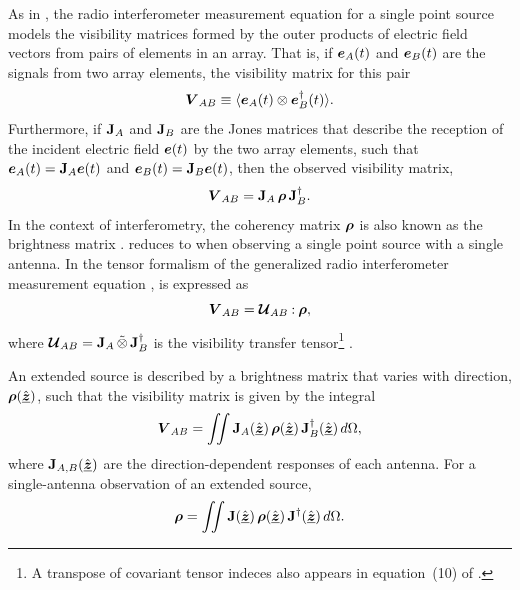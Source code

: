 As in \cite{smi11a}, the radio interferometer measurement equation for a single point source models the
visibility matrices formed by the outer products of electric field vectors from pairs of elements in an array.  That is, if $\mbox{\boldmath $e$}_A(t)$ and $\mbox{\boldmath $e$}_B(t)$ are the signals from two array elements, the visibility matrix for this pair
%
\begin{equation}
  \label{eqn:visibility}
  \mbox{\boldmath $V$}_{AB} \equiv\langle\mbox{\boldmath $e$}_A(t) \otimes \mbox{\boldmath $e$}_B^\dagger(t) \rangle.
\end{equation}
Furthermore, if ${\bf J}_A$ and ${\bf J}_B$ are the Jones matrices that describe the reception of the incident electric field $\mbox{\boldmath $e$}(t)$ by the two array elements, such that $\mbox{\boldmath $e$}_A(t) = {\bf J}_A \mbox{\boldmath $e$}(t)$ and $\mbox{\boldmath $e$}_B(t) = {\bf J}_B \mbox{\boldmath $e$}(t)$,
then the observed visibility matrix,
%
\begin{equation}
\mbox{\boldmath $V$}_{AB} =
{\bf J}_A \, \mbox{\boldmath $\rho$} \, {\bf J}_B^\dagger.
\label{eqn:brightness}
\end{equation}
In the context of interferometry, the coherency matrix $\mbox{\boldmath $\rho$}$ is also known as the brightness matrix \citep{smi11a}.
%
 reduces to  when observing a single point source with a single antenna.
%
In the tensor formalism of the generalized radio interferometer measurement equation \citep{smi11d},  is expressed as
%
\begin{equation}
\mbox{\boldmath $V$}_{AB} =
{\mbox{\boldmath $\mathcal{U}$}_{AB}}\mathbin{:}{\mbox{\boldmath $\rho$}},
\label{eqn:tensor_rime}
\end{equation}
%
where $\mbox{\boldmath $\mathcal{U}$}_{AB}={{\bf J}_A}\,\tilde{\otimes}\,{{\bf J}_B^\dagger}$
is the visibility transfer tensor\footnote{A transpose of covariant tensor indeces also appears in equation~(10)
of \cite{smi11d}.} .


An extended source is described by a brightness matrix that varies with direction, $\mbox{\boldmath $\rho$}(\hat{\underline{\mbox{\boldmath $z$}}})$, such that the visibility matrix is given
by the integral
%
\begin{equation}
\mbox{\boldmath $V$}_{AB} = \iint
{\bf J}_A(\hat{\underline{\mbox{\boldmath $z$}}}) \, \mbox{\boldmath $\rho$}(\hat{\underline{\mbox{\boldmath $z$}}}) \, {\bf J}_B^\dagger(\hat{\underline{\mbox{\boldmath $z$}}}) \, d\Omega,
\label{eqn:visibility_integral}
\end{equation}
where ${\bf J}_{A,B}(\hat{\underline{\mbox{\boldmath $z$}}})$ are the direction-dependent responses of each
antenna.  For a single-antenna observation of an extended source,
%
\begin{equation}
\mbox{\boldmath $\rho$} = \iint
{\bf J}(\hat{\underline{\mbox{\boldmath $z$}}}) \, \mbox{\boldmath $\rho$}(\hat{\underline{\mbox{\boldmath $z$}}}) \, {\bf J}^\dagger(\hat{\underline{\mbox{\boldmath $z$}}}) \, d\Omega.
\label{eqn:coherency_integral}
\end{equation}

